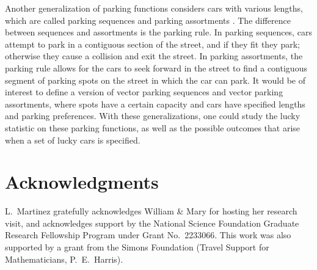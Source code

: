 \documentclass[reqno]{amsart}
\theoremstyle{definition}
\theoremstyle{remark}
\begin{document}
Another generalization of parking functions considers cars with various lengths, which are called parking sequences and parking assortments \cites{EhrenborgHapp,assortments}. The difference between sequences and assortments is the parking rule. In parking sequences, cars attempt to park in a contiguous section of the street, and if they fit they park; otherwise they cause a collision and exit the street. In parking assortments, the parking rule allows for the cars to seek forward in the street to find a contiguous segment of parking spots on the street in which the car can park. It would be of interest to define a version of vector parking sequences and vector parking assortments, where spots have a certain capacity and cars have specified lengths and parking preferences. With these generalizations, one could study the lucky statistic on these parking functions, as well as the possible outcomes that arise when a set of lucky cars is specified. 


\section*{Acknowledgments}

L.~Martinez gratefully acknowledges William \& Mary for hosting her research visit, and acknowledges support by the National Science Foundation Graduate Research Fellowship Program under Grant No.~2233066. This work was also supported by a grant from the Simons Foundation (Travel Support for Mathematicians, P.~E.~Harris).




\end{document}
